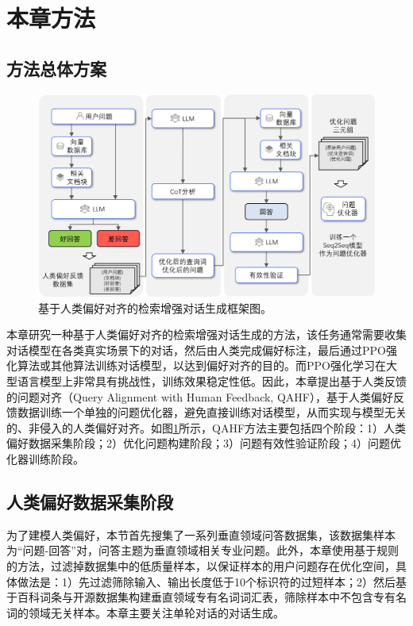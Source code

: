 \section{本章方法}

\subsection{方法总体方案}

\begin{figure}[htbp]
	\centering
	\includegraphics[scale=0.55]{Fig/qahf_framework.png}
	\caption{\label{qahf_framework}基于人类偏好对齐的检索增强对话生成框架图。}
\end{figure}

本章研究一种基于人类偏好对齐的检索增强对话生成的方法，该任务通常需要收集对话模型在各类真实场景下的对话，然后由人类完成偏好标注，最后通过PPO强化算法或其他算法训练对话模型，以达到偏好对齐的目的。而PPO强化学习在大型语言模型上非常具有挑战性，训练效果稳定性低。因此，本章提出基于人类反馈的问题对齐（Query Alignment with Human Feedback, QAHF），基于人类偏好反馈数据训练一个单独的问题优化器，避免直接训练对话模型，从而实现与模型无关的、非侵入的人类偏好对齐。如图\ref{qahf_framework}所示，QAHF方法主要包括四个阶段：1）人类偏好数据采集阶段；2）优化问题构建阶段；3）问题有效性验证阶段；4）问题优化器训练阶段。

\subsection{人类偏好数据采集阶段}

为了建模人类偏好，本节首先搜集了一系列垂直领域问答数据集，该数据集样本为“问题-回答”对，问答主题为垂直领域相关专业问题。此外，本章使用基于规则的方法，过滤掉数据集中的低质量样本，以保证样本的用户问题存在优化空间，具体做法是：1）先过滤筛除输入、输出长度低于10个标识符的过短样本；2）然后基于百科词条与开源数据集构建垂直领域专有名词词汇表，筛除样本中不包含专有名词的领域无关样本。本章主要关注单轮对话的对话生成。


